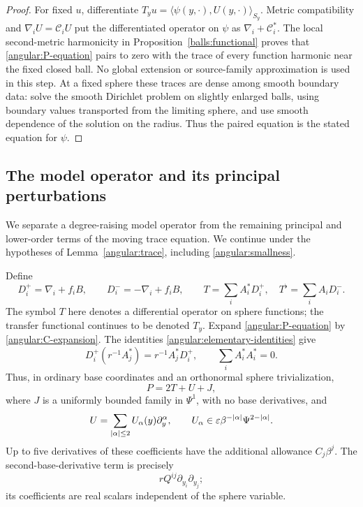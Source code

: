 \begin{proof}
For fixed $u$, differentiate
$T_yu=\langle\psi(y,\cdot),U(y,\cdot)\rangle_{S_y}$.
Metric compatibility and $\nabla_iU=\mathcal C_iU$ put the differentiated
operator on $\psi$ as $\nabla_i+\mathcal C_i^*$.
The local second-metric harmonicity in
Proposition~\ref{balls:functional} proves that
\eqref{angular:P-equation} pairs to zero with the trace of every
function harmonic near the fixed closed ball.  No global extension
or source-family approximation is used in this step.
At a fixed sphere these traces are dense among
smooth boundary data: solve the smooth Dirichlet problem on slightly
enlarged balls, using boundary values transported from the limiting sphere,
and use smooth dependence of the solution on the radius.  Thus the paired
equation is the stated equation for $\psi$.
\end{proof}

\subsection{The model operator and its principal perturbations}

We separate a degree-raising model operator from the remaining
principal and lower-order terms of the moving trace equation.  We continue under the hypotheses of
Lemma~\ref{angular:trace}, including \eqref{angular:smallness}.

Define
\begin{equation}\label{angular:T-definition}
 D_i^+=\nabla_i+f_iB,\qquad D_i^-=-\nabla_i+f_iB,
 \qquad
 T=\sum_i A_i^*D_i^+,\quad T^\flat=\sum_i A_iD_i^-.
\end{equation}
The symbol $T$ here denotes a differential operator on sphere functions;
the transfer functional continues to be denoted $T_y$.
Expand \eqref{angular:P-equation} by
\eqref{angular:C-expansion}.  The identities
\eqref{angular:elementary-identities} give
\[
 D_i^+(r^{-1}A_j^*)=r^{-1}A_j^*D_i^+,
 \qquad \sum_iA_i^*A_i^*=0.
\]
Thus, in ordinary base coordinates and an orthonormal sphere
trivialization,
\begin{equation}\label{angular:P-decomposition}
 P=2T+U+J,
\end{equation}
where $J$ is a uniformly bounded family in $\Psi^1$, with no base
derivatives, and
\begin{equation}\label{angular:U-bounds}
 U=\sum_{|\alpha|\le2}U_\alpha(y)\partial_y^\alpha,
 \qquad U_\alpha\in\varepsilon\beta^{-|\alpha|}
                               \Psi^{2-|\alpha|}.
\end{equation}
Up to five derivatives of these coefficients have the additional
allowance $C_j\beta^j$.  The second-base-derivative term is precisely
\begin{equation}\label{angular:real-principal-part}
 rQ^{ij}\partial_{y_i}\partial_{y_j};
\end{equation}
its coefficients are real scalars independent of the sphere variable.

